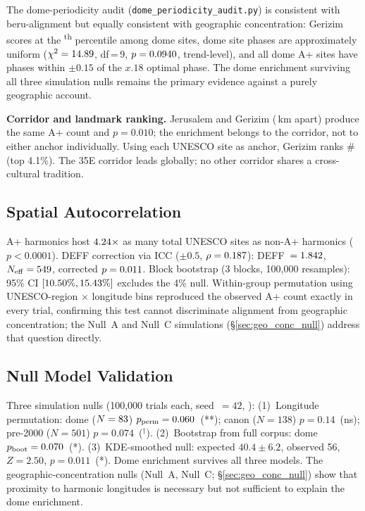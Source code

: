 \documentclass[HARVARD,twocolumn]{USG}
\begin{document}
The dome-periodicity audit (\texttt{dome\_periodicity\_audit.py}) is consistent
with beru-alignment but equally consistent with geographic concentration:
Gerizim scores at the \domeGerizimPctile\textsuperscript{th} percentile
among dome sites, dome site phases are approximately uniform
($\chi^2 = 14.89$, df\,=\,9, $p = 0.0940$, trend-level),
and all \NcircTierAp{} dome A+ sites have phases within
$\pm 0.15$\textdegree{} of the $x.18$\textdegree{} optimal phase.
The dome enrichment surviving all three simulation nulls remains the primary
evidence against a purely geographic account.

\textbf{Corridor and landmark ranking.}
Jerusalem and Gerizim (\GerizimJerusalemKm\,km apart) produce the same
A+ count and $p = 0.010$; the enrichment belongs to the corridor, not to
either anchor individually. Using each UNESCO site as anchor, Gerizim ranks
\#\GerizimTempleRank{} (top 4.1\%). The 35\textdegree{}E corridor leads
globally; no other corridor shares a cross-cultural tradition.

\subsection{Spatial Autocorrelation}
\label{sec:autocorrelation}

A+ harmonics host $4.24\times$ as many total UNESCO
sites as non-A+ harmonics ($p < 0.0001$).
DEFF correction via ICC ($\pm 0.5$\textdegree{}, $\rho = 0.187$):
DEFF~$= 1.842$, $N_\mathrm{eff} = 549$,
corrected $p = 0.011$.
Block bootstrap (3\textdegree{} blocks, 100{,}000 resamples):
95\% CI $[10.50\%, 15.43\%]$ excludes the 4\% null.
Within-group permutation using UNESCO-region $\times$ longitude bins
reproduced the observed A+ count exactly in every trial, confirming this
test cannot discriminate alignment from geographic concentration;
the Null~A and Null~C simulations (\S\ref{sec:geo_conc_null})
address that question directly.

\subsection{Null Model Validation}
\label{sec:simulation_null}

Three simulation nulls (100{,}000 trials each, seed~$= 42$,
\citealt{good2005permutation}):
(1)~Longitude permutation: dome ($N = 83$)
$p_\mathrm{perm} = 0.060$~(**);
canon ($N = 138$) $p = 0.14$~(ns);
pre-2000 ($N = 501$) $p = 0.074$~($^\dagger$).
(2)~Bootstrap from full corpus: dome $p_\mathrm{boot} = 0.070$~(*).
(3)~KDE-smoothed null: expected $40.4 \pm 6.2$, observed 56, $Z = 2.50$,
$p = 0.011$~(*).
Dome enrichment survives all three models.
The geographic-concentration nulls (Null~A, Null~C;
\S\ref{sec:geo_conc_null}) show that proximity to harmonic longitudes
is necessary but not sufficient to explain the dome enrichment.
\end{document}
